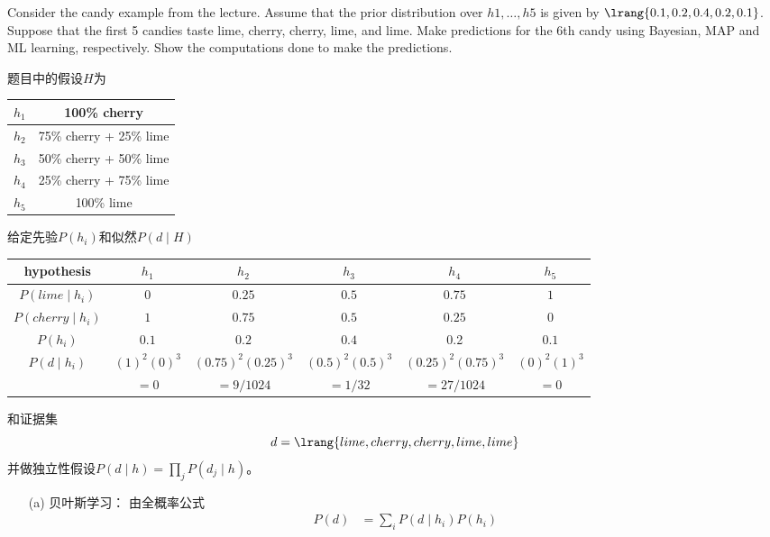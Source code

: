 \documentclass[a4paper, 11pt]{article}
\begin{document}
\begin{question}\normalfont
Consider the candy example from the lecture. Assume that the prior distribution over $h1, \ldots, h5$ is given by $\lrang{0.1, 0.2, 0.4, 0.2, 0.1}$. Suppose that the first 5 candies taste lime, cherry, cherry, lime, and lime. Make predictions for the 6th candy using Bayesian, MAP and ML learning, respectively. Show
the computations done to make the predictions.
\end{question}
\begin{answer}
    题目中的假设$H$为
    \begin{center}
        \begin{tabular}{|c|c|}\hline
            $h_1$ & 100\% cherry\\\hline
            $h_2$ & 75\% cherry + 25\%  lime\\\hline
            $h_3$ & 50\% cherry + 50\% lime\\\hline
            $h_4$ & 25\% cherry + 75\% lime\\\hline
            $h_5$ & 100\% lime\\\hline
        \end{tabular}
    \end{center}
    给定先验$P(h_i)$和似然$P(d\mid H)$
    \begin{center}
    \begin{tabular}{|c|c|c|c|c|c|}\hline
        hypothesis & $h_1$ & $h_2$ & $h_3$ & $h_4$ & $h_5$\\\hline
        $P(lime\mid h_i)$ & $0$ & $0.25$ & $0.5$ & $0.75$ & $1$\\\hline
        $P(cherry\mid h_i)$ & $1$ & $0.75$ & $0.5$ & $0.25$ & $0$\\\hline
        $P(h_i)$ & $0.1$ & $0.2$ & $0.4$ & 0.2 & $0.1$\\\hline
        $P(d\mid h_i)$ & $(1)^2(0)^3$ & $(0.75)^2(0.25)^3$ & $(0.5)^2(0.5)^3$ & $(0.25)^2(0.75)^3$ & $(0)^2(1)^3$\\
        & $=0$ & $=9/1024$ & $=1/32$ & $=27/1024$ & $=0$\\\hline
    \end{tabular}
    \end{center}
    和证据集
    \[d=\lrang{lime, cherry, cherry, lime, lime}\]
    并做独立性假设$P(d\mid h)=\prod_j P(d_j\mid h)$。
\begin{itemize}
    \item [(a)] 贝叶斯学习：
    由全概率公式
    \[\begin{aligned}
        P(d)&=\sum_i P(d\mid h_i)P(h_i)\\

\end{aligned}\]
\end{itemize}
\end{answer}
\end{document}
